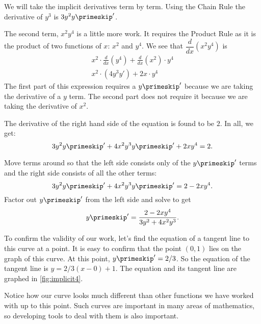 {We will take the implicit derivatives term by term. Using the Chain Rule the derivative of $y^3$ is $3y^2 y\primeskip'$.

The second term, $x^2y^4$ is a little more work. It requires the Product Rule as it is the product of two functions of $x$: $x^2$ and $y^4$. We see that $\dfrac{d}{dx}(x^2y^4)$ is
\begin{gather*}
x^2 \cdot \frac{d}{dx}(y^4) + \frac{d}{dx}(x^2) \cdot y^4 \\
x^2 \cdot (4y^3y') + 2x \cdot y^4 
\end{gather*}
The first part of this expression requires a $y\primeskip'$ because we are taking the derivative of a $y$ term. The second part does not require it because we are taking the derivative of $x^2$.

The derivative of the right hand side of the equation is found to be $2$. In all, we get:
\[3y^2y\primeskip' + 4x^2y^3y\primeskip' + 2xy^4 = 2.\]

Move terms around so that the left side consists only of the $y\primeskip'$ terms and the right side consists of all the other terms:
$$3y^2y\primeskip' + 4x^2y^3y\primeskip' = 2-2xy^4.$$
Factor out $y\primeskip'$ from the left side and solve to get
$$y\primeskip' = \frac{2-2xy^4}{3y^2+4x^2y^3}.$$

To confirm the validity of our work, let's find the equation of a tangent line to this curve at a point. It is easy to confirm that the point $(0,1)$ lies on the graph of this curve. At this point, $y\primeskip' = 2/3$. So the equation of the tangent line is $y = 2/3(x-0)+1$. The equation and its tangent line are graphed in \autoref{fig:implicit4}.


Notice how our curve looks much different than other functions we have worked with up to this point.
Such curves are important in many areas of mathematics, so developing tools to deal with them is also important.}


